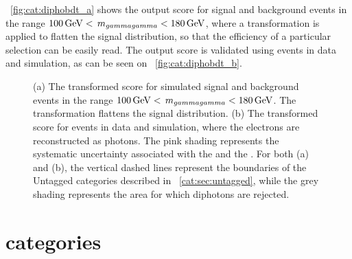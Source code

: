 \Fig~\ref{fig:cat:diphobdt_a} shows the \DiPhoBdt output score for signal and background events in the range $100\,\text{Ge\hspace{-.08em}V} < \,m_{gammagamma} < 180\,\text{Ge\hspace{-.08em}V}$, where a transformation is applied to flatten the signal distribution, so that the efficiency of a particular selection can be easily read. The \DiPhoBdt output score is validated using \Zee events in data and simulation, as can be seen on \Fig~\ref{fig:cat:diphobdt_b}.

\begin{figure}[h]
\centering
\caption{ (a) The transformed \DiPhoBdt score for simulated signal and background events in the range $100\,\text{Ge\hspace{-.08em}V} < \,m_{gammagamma} < 180\,\text{Ge\hspace{-.08em}V}$. The transformation flattens the signal distribution. (b) The transformed \DiPhoBdt score for \Zee events in data and simulation, where the electrons are reconstructed as photons. The pink shading represents the systematic uncertainty associated with the \PhoIdBdt and the \PhoEnergyBdt. For both (a) and (b), the vertical dashed lines represent the boundaries of the Untagged categories described in \Sec~\ref{cat:sec:untagged}, while the grey shading represents the area for which diphotons are rejected.}
\label{fig:cat:diphobdt}
\end{figure}

\section{\VBFTag categories }
\label{cat:sec:vbftag}

